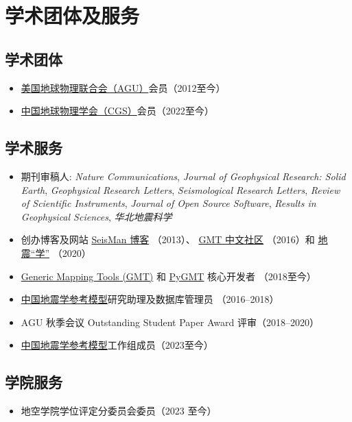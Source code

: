 \section{学术团体及服务}

\subsection{学术团体}
\begin{itemize}
\item \href{https://sites.agu.org/}{美国地球物理联合会（AGU）}会员（2012至今）
\item \href{http://www.cgscgs.org.cn/}{中国地球物理学会（CGS）}会员（2022至今）
\end{itemize}

\subsection{学术服务}
\begin{itemize}
\item 期刊审稿人:
      \emph{Nature Communications},
      \emph{Journal of Geophysical Research: Solid Earth},
      \emph{Geophysical Research Letters},
      \emph{Seismological Research Letters},
      \emph{Review of Scientific Instruments},
      \emph{Journal of Open Source Software},
      \emph{Results in Geophysical Sciences},
      \emph{华北地震科学}
\item 创办博客及网站
      \href{https://blog.seisman.info}{SeisMan 博客} （2013）、
      \href{http://gmt-china.org/}{GMT 中文社区} （2016）和
      \href{https://seismo-learn.org/}{地震``学''} （2020）
\item \href{https://github.com/GenericMappingTools/gmt}{Generic Mapping Tools (GMT)} 和
      \href{https://github.com/GenericMappingTools/pygmt}{PyGMT} 核心开发者 （2018至今）
\item \href{http://chinageorefmodel.org/}{中国地震学参考模型}研究助理及数据库管理员 （2016--2018）
\item AGU 秋季会议 Outstanding Student Paper Award 评审（2018--2020）
\item \href{http://chinageorefmodel.org/}{中国地震学参考模型}工作组成员（2023至今）
\end{itemize}

\subsection{学院服务}
\begin{itemize}
\item 地空学院学位评定分委员会委员（2023 至今）
\end{itemize}
